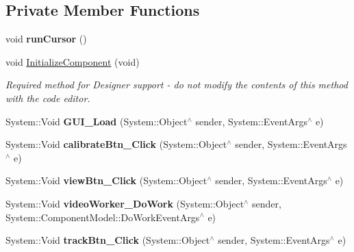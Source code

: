 \subsection*{Private Member Functions}
\begin{DoxyCompactItemize}
\item 
\mbox{\label{class_gaze_track_g_u_i_1_1_g_u_i_a6fcaa71af546f9c8acb9eae88bd6f844}} 
void {\bfseries run\+Cursor} ()
\item 
void \mbox{\hyperlink{class_gaze_track_g_u_i_1_1_g_u_i_a4d90e141eec46a50f52c00d83978ce5d}{Initialize\+Component}} (void)
\begin{DoxyCompactList}\small\item\em Required method for Designer support -\/ do not modify the contents of this method with the code editor. \end{DoxyCompactList}\item 
\mbox{\label{class_gaze_track_g_u_i_1_1_g_u_i_a88d27dd9a04f4c7f8d87551058f2bac0}} 
System\+::\+Void {\bfseries G\+U\+I\+\_\+\+Load} (System\+::\+Object$^\wedge$ sender, System\+::\+Event\+Args$^\wedge$ e)
\item 
\mbox{\label{class_gaze_track_g_u_i_1_1_g_u_i_a86a4fe6c88d6c10d84b481f828c64656}} 
System\+::\+Void {\bfseries calibrate\+Btn\+\_\+\+Click} (System\+::\+Object$^\wedge$ sender, System\+::\+Event\+Args$^\wedge$ e)
\item 
\mbox{\label{class_gaze_track_g_u_i_1_1_g_u_i_abb0501bbf7342ea5d22b7d6090782802}} 
System\+::\+Void {\bfseries view\+Btn\+\_\+\+Click} (System\+::\+Object$^\wedge$ sender, System\+::\+Event\+Args$^\wedge$ e)
\item 
\mbox{\label{class_gaze_track_g_u_i_1_1_g_u_i_a1eefaa758c2070f768710c50c60ca2d7}} 
System\+::\+Void {\bfseries video\+Worker\+\_\+\+Do\+Work} (System\+::\+Object$^\wedge$ sender, System\+::\+Component\+Model\+::\+Do\+Work\+Event\+Args$^\wedge$ e)
\item 
\mbox{\label{class_gaze_track_g_u_i_1_1_g_u_i_ac5243fb1e2513fe4ffb8a44449abcb35}} 
System\+::\+Void {\bfseries track\+Btn\+\_\+\+Click} (System\+::\+Object$^\wedge$ sender, System\+::\+Event\+Args$^\wedge$ e)

\end{DoxyCompactItemize}
